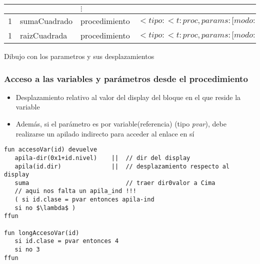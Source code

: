 \documentclass[hyperref={pdfpagelabels=false},tree-dvips,compress]{beamer}
\begin{document}
\begin{frame}[fragile]
\begin{tabular*}{\textwidth}{|l|l|l|p{}|}
               &                   & $\vdots$          &                                                                                                                                                                                                                                                                       \\ \hline
1              & sumaCuadrado      & procedimiento     & $<tipo:<t:proc, params: {[}modo:valor{]}, tipo:<tipo:<t:num>{]}{[}modo:valor, tipo:<t:num>{]}{[}modo:variable, tipo:<t:num>{]}>>>$                    \\ \hline
1              & raizCuadrada      & procedimiento     & $<tipo:<t:proc, params: {[}modo:valor{]}, tipo:<t:num>{]}>>$                                                                                                                                                   \\ \hline
\end{tabular*}

Dibujo con los parametros y sus desplazamientos

\end{frame}
\begin{frame}[fragile]
\frametitle{Acceso a las variables y parámetros desde el procedimiento}

\begin{itemize}
	\item Desplazamiento relativo al valor del display del bloque en el que reside la variable
	\item Además, si el parámetro es por variable(referencia) (tipo \emph{pvar}), debe realizarse un apilado indirecto para acceder al enlace en sí
\end{itemize}

\begin{lstlisting}[style=codigoMP,basicstyle=\scriptsize\ttfamily,mathescape]
fun accesoVar(id) devuelve
   apila-dir(0x1+id.nivel)    ||  // dir del display
   apila(id.dir)              ||  // desplazamiento respecto al display
   suma                           // traer dir0valor a Cima
   // aqui nos falta un apila_ind !!!
   ( si id.clase = pvar entonces apila-ind
   si no $\lambda$ )
ffun

fun longAccesoVar(id)
   si id.clase = pvar entonces 4
   si no 3
ffun
\end{lstlisting}

\end{frame}
\end{document}
